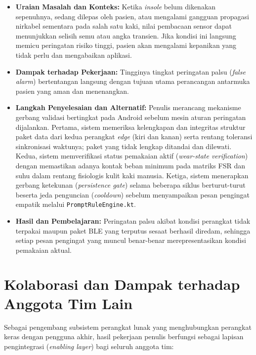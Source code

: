 \begin{itemize}
    \item \textbf{Uraian Masalah dan Konteks:} Ketika \textit{insole} belum dikenakan sepenuhnya, sedang dilepas oleh pasien, atau mengalami gangguan propagasi nirkabel sementara pada salah satu kaki, nilai pembacaan sensor dapat menunjukkan selisih semu atau angka transien. Jika kondisi ini langsung memicu peringatan risiko tinggi, pasien akan mengalami kepanikan yang tidak perlu dan mengabaikan aplikasi.
    \item \textbf{Dampak terhadap Pekerjaan:} Tingginya tingkat peringatan palsu (\textit{false alarm}) bertentangan langsung dengan tujuan utama perancangan antarmuka pasien yang aman dan menenangkan.
    \item \textbf{Langkah Penyelesaian dan Alternatif:} Penulis merancang mekanisme gerbang validasi bertingkat pada Android sebelum mesin aturan peringatan dijalankan. Pertama, sistem memeriksa kelengkapan dan integritas struktur paket data dari kedua perangkat \textit{edge} (kiri dan kanan) serta rentang toleransi sinkronisasi waktunya; paket yang tidak lengkap ditandai dan dilewati. Kedua, sistem memverifikasi status pemakaian aktif (\textit{wear-state verification}) dengan memastikan adanya kontak beban minimum pada matriks FSR dan suhu dalam rentang fisiologis kulit kaki manusia. Ketiga, sistem menerapkan gerbang ketekunan (\textit{persistence gate}) selama beberapa siklus berturut-turut beserta jeda penguncian (\textit{cooldown}) sebelum menyampaikan pesan pengingat empatik melalui \texttt{PromptRuleEngine.kt}.
    \item \textbf{Hasil dan Pembelajaran:} Peringatan palsu akibat kondisi perangkat tidak terpakai maupun paket BLE yang terputus sesaat berhasil diredam, sehingga setiap pesan pengingat yang muncul benar-benar merepresentasikan kondisi pemakaian aktual.
\end{itemize}

\section{Kolaborasi dan Dampak terhadap Anggota Tim Lain}
\label{sec:kolaborasi_dampak}

Sebagai pengembang subsistem perangkat lunak yang menghubungkan perangkat keras dengan pengguna akhir, hasil pekerjaan penulis berfungsi sebagai lapisan pengintegrasi (\textit{enabling layer}) bagi seluruh anggota tim:

